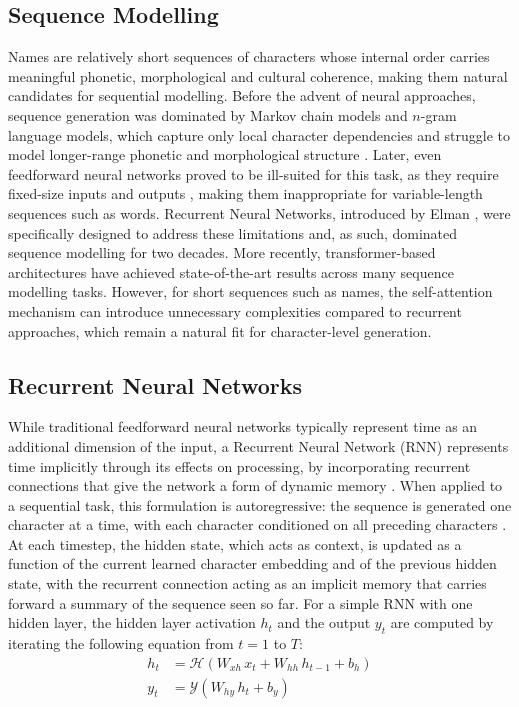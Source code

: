 \documentclass[Main.tex]{subfiles}
\begin{document}
\label{ch:literature review}

\subsection{Sequence Modelling}
Names are relatively short sequences of characters whose internal order carries meaningful phonetic, morphological and cultural coherence, making them natural candidates for sequential modelling. Before the advent of neural approaches, sequence generation was dominated by Markov chain models and $n$-gram language models, which capture only local character dependencies and struggle to model longer-range phonetic and morphological structure \cite{jurafsky_speech_2026}. Later, even feedforward neural networks proved to be ill-suited for this task, as they require fixed-size inputs and outputs \cite{sutskever_sequence_2014}, making them inappropriate for variable-length sequences such as words. Recurrent Neural Networks, introduced by Elman \cite{elman_finding_1990}, were specifically designed to address these limitations and, as such, dominated sequence modelling for two decades. More recently, transformer-based architectures \cite{vaswani_attention_2017} have achieved state-of-the-art results across many sequence modelling tasks. However, for short sequences such as names, the self-attention mechanism can introduce unnecessary complexities compared to recurrent approaches, which remain a natural fit for character-level generation.\\

\subsection{Recurrent Neural Networks}
While traditional feedforward neural networks typically represent time as an additional dimension of the input, a Recurrent Neural Network (RNN) represents time implicitly through its effects on processing, by incorporating recurrent connections that give the network a form of dynamic memory \cite{elman_finding_1990}. When applied to a sequential task, this formulation is autoregressive: the sequence is generated one character at a time, with each character conditioned on all preceding characters \cite{graves_generating_2013, elman_finding_1990}. At each timestep, the hidden state, which acts as context, is updated as a function of the current learned character embedding and of the previous hidden state, with the recurrent connection acting as an implicit memory that carries forward a summary of the sequence seen so far. For a simple RNN with one hidden layer, the hidden layer activation $h_t$ and the output $y_t$ are computed by iterating the following equation from $t = 1$ to $T$:
\begin{align}
    h_t &= \mathcal{H}(W_{xh}\, x_t + W_{hh}\, h_{t-1} + b_h) \\
    y_t &= \mathcal{Y}(W_{hy}\, h_t + b_y)
\end{align}
\end{document}
